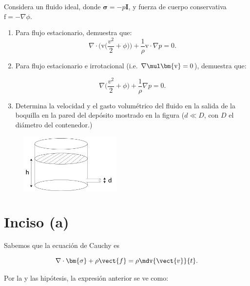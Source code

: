 \documentclass[../main.tex]{subfiles}
\begin{document}
\begin{problema}
	Considera un fluido ideal, donde \(\bm{\sigma} = -p \bm{I}\),
	y fuerza de cuerpo conservativa \(\bm{\mathrm{f}} = - \nabla{\phi}\).

	\begin{enumerate}
		\item Para flujo estacionario, demuestra que:
		      \begin{equation*}
			      \nabla \cdot{\Biggl(\bm{\mathrm{v}}\Biggl(\dfrac{v^{2}}{2} + \phi\Biggr)\Biggr)}
			      + \dfrac{1}{\rho}\bm{\mathrm{v}} \cdot \nabla{p} = 0.
		      \end{equation*}
		\item Para flujo estacionario e irrotacional (i.e. \(\nabla \mul\bm{\mathrm{v}} = 0\)),
		      demuestra que:

		      \begin{equation*}
			      \nabla{\Biggl(\dfrac{v^{2}}{2} + \phi\Biggr)} + \dfrac{1}{\rho}\nabla{p} = 0.
		      \end{equation*}
		\item Determina la velocidad y el gasto volumétrico del fluido en la salida
		      de la boquilla en la pared del depósito mostrado en la figura
		      (\(d \ll D\), con \(D\) el diámetro del contenedor.)
	\end{enumerate}

	\begin{figure}[htb]
		\centering
		\includegraphics[width=0.45\textwidth]{figs/problema02.png}
	\end{figure}

	\startsolution

	\section*{Inciso (a)}
	Sabemos que la ecuación de Cauchy es

	\begin{equation*}
		\nabla \cdot{\bm{\sigma}} + \rho \vect{f} = \rho \mdv{\vect{v}}{t}.
	\end{equation*}

	Por la  y las hipótesis, la expresión anterior se ve como:


\end{problema}
\end{document}
